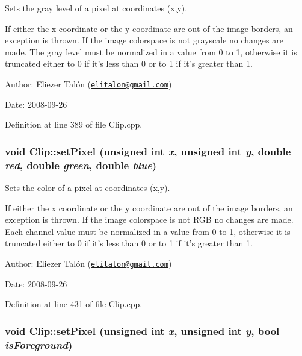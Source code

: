 Sets the gray level of a pixel at coordinates (x,y). 

If either the x coordinate or the y coordinate are out of the image borders, an exception is thrown. If the image colorspace is not grayscale no changes are made. The gray level must be normalized in a value from 0 to 1, otherwise it is truncated either to 0 if it's less than 0 or to 1 if it's greater than 1.

\begin{Desc}
\item[Author:]Eliezer Talón (\href{mailto:elitalon@gmail.com}{\tt elitalon@gmail.com}) \end{Desc}
\begin{Desc}
\item[Date:]2008-09-26 \end{Desc}


Definition at line 389 of file Clip.cpp.\hypertarget{class_clip_1e28a9ed2676460de4b5b9ab1b985f4c}{
\subsubsection[setPixel]{\setlength{\rightskip}{0pt plus 5cm}void Clip::setPixel (unsigned int {\em x}, \/  unsigned int {\em y}, \/  double {\em red}, \/  double {\em green}, \/  double {\em blue})}}
\label{class_clip_1e28a9ed2676460de4b5b9ab1b985f4c}


Sets the color of a pixel at coordinates (x,y). 

If either the x coordinate or the y coordinate are out of the image borders, an exception is thrown. If the image colorspace is not RGB no changes are made. Each channel value must be normalized in a value from 0 to 1, otherwise it is truncated either to 0 if it's less than 0 or to 1 if it's greater than 1.

\begin{Desc}
\item[Author:]Eliezer Talón (\href{mailto:elitalon@gmail.com}{\tt elitalon@gmail.com}) \end{Desc}
\begin{Desc}
\item[Date:]2008-09-26 \end{Desc}


Definition at line 431 of file Clip.cpp.\hypertarget{class_clip_9e78d68c58016aaff8c65ddac29ed07f}{
\subsubsection[setPixel]{\setlength{\rightskip}{0pt plus 5cm}void Clip::setPixel (unsigned int {\em x}, \/  unsigned int {\em y}, \/  bool {\em isForeground})}}
\label{class_clip_9e78d68c58016aaff8c65ddac29ed07f}


